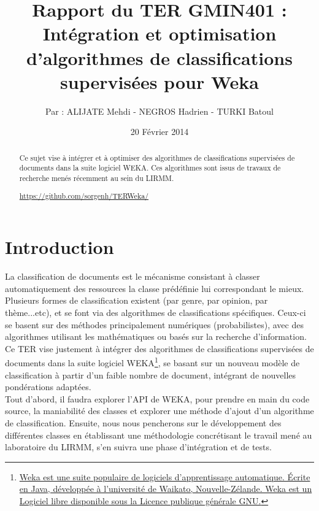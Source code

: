 \documentclass{article}
\title{Rapport du TER GMIN401 :\\ \textbf{Intégration et optimisation d’algorithmes de classifications supervisées pour Weka}}
\author{Par : ALIJATE Mehdi - NEGROS Hadrien - TURKI Batoul}
\date{20 Février 2014}
\begin{document}
\maketitle
\tableofcontents

\begin{abstract}
	
Ce sujet vise à intégrer et à optimiser des algorithmes de classifications supervisées de documents dans la suite logiciel WEKA. Ces algorithmes sont issus de travaux de recherche menés récemment au sein du LIRMM.
\begin{center}
\href{https://github.com/sorgenh/TERWeka/}{https://github.com/sorgenh/TERWeka/}
\end{center}
\end{abstract}

\newpage 
\section{Introduction}\label{sec:intro}
La classification de documents est le mécanisme consistant à classer automatiquement des ressources la classe prédéfinie lui correspondant le mieux.\\
Plusieurs formes de classification existent (par genre, par opinion, par thème...etc), et se font via des algorithmes de classifications spécifiques. Ceux-ci se basent sur des méthodes principalement numériques (probabilistes), avec des algorithmes utilisant les mathématiques ou basés sur la recherche d'information. \\
Ce TER vise justement à intégrer des algorithmes de classifications supervisées de documents dans la suite logiciel WEKA\footnote{\href{http://www.cs.waikato.ac.nz/~ml/weka/}{Weka est une suite populaire de logiciels d'apprentissage automatique. Écrite en Java, développée à l'université de Waikato, Nouvelle-Zélande. Weka est un Logiciel libre disponible sous la Licence publique générale GNU.}}, se basant sur un nouveau modèle de classification à partir d'un faible nombre de document, intégrant de nouvelles pondérations adaptées.\\
Tout d'abord, il faudra explorer l'API de WEKA, pour prendre en main du code source, la maniabilité des classes et explorer une méthode d'ajout d'un algorithme de classification. Ensuite, nous nous pencherons sur le développement des différentes classes en établissant une méthodologie concrétisant le travail mené au laboratoire du LIRMM, s'en suivra une phase d'intégration et de tests.
\end{document}
